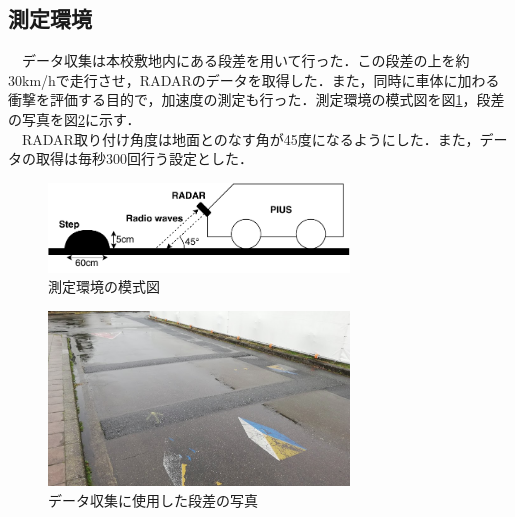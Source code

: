 \subsection{測定環境}
　データ収集は本校敷地内にある段差を用いて行った．この段差の上を約30km/hで走行させ，RADARのデータを取得した．また，同時に車体に加わる衝撃を評価する目的で，加速度の測定も行った．測定環境の模式図を図\ref{fig:RADAR_MountingPosition}，段差の写真を図\ref{fig:step}に示す．\\
　RADAR取り付け角度は地面とのなす角が45度になるようにした．また，データの取得は毎秒300回行う設定とした．
\begin{figure}[H]
    \centering
    \includegraphics[width=8cm]{./fig/RADAR_MountingPosition.pdf}
    \caption{測定環境の模式図}
    \label{fig:RADAR_MountingPosition}
\end{figure}
\begin{figure}[H]
    \centering
    \includegraphics[width=8cm]{./fig/step.png}
    \caption{データ収集に使用した段差の写真}
    \label{fig:step}
\end{figure}

